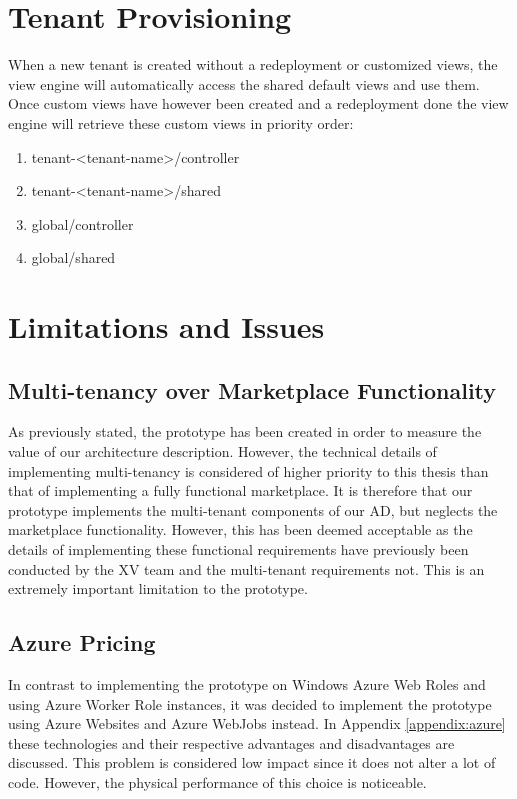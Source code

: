 \section{Tenant Provisioning}
When a new tenant is created without a redeployment or customized views, the view engine will automatically access the shared default views and use them. Once custom views have however been created and a redeployment done the view engine will retrieve these custom views in priority order:
\begin{enumerate}
\item tenant-<tenant-name>/controller
\item tenant-<tenant-name>/shared
\item global/controller
\item global/shared
\end{enumerate}

\section{Limitations and Issues}

\subsection{Multi-tenancy over Marketplace Functionality}
As previously stated, the prototype has been created in order to measure the value of our architecture description. However, the technical details of implementing multi-tenancy is considered of higher priority to this thesis than that of implementing a fully functional marketplace. It is therefore that our prototype implements the multi-tenant components of our AD, but neglects the marketplace functionality. However, this has been deemed acceptable as the details of implementing these functional requirements have previously been conducted by the XV team and the multi-tenant requirements not. This is an extremely important limitation to the prototype. 

\subsection{Azure Pricing}
In contrast to implementing the prototype on Windows Azure Web Roles and using Azure Worker Role instances, it was decided to implement the prototype using Azure Websites and Azure WebJobs instead. In Appendix \ref{appendix:azure} these technologies and their respective advantages and disadvantages are discussed. This problem is considered low impact since it does not alter a lot of code. However, the physical performance of this choice is noticeable.

